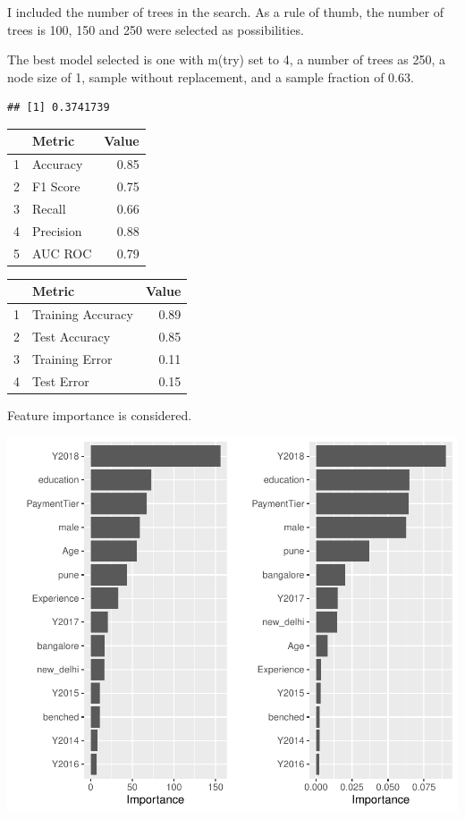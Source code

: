 \documentclass[11pt,preprint, authoryear]{elsarticle}
\let\origtable\table
\let\endorigtable\endtable
\renewenvironment{table}[1][2] {
    \expandafter\origtable\expandafter[H]
} {
    \endorigtable
}
\numberwithin{equation}{section}
\numberwithin{figure}{section}
\numberwithin{table}{section}
\begin{document}
I included the number of trees in the search. As a rule of thumb, the
number of trees is 100, 150 and 250 were selected as possibilities.

The best model selected is one with m(try) set to 4, a number of trees
as 250, a node size of 1, sample without replacement, and a sample
fraction of 0.63.

\begin{verbatim}
## [1] 0.3741739
\end{verbatim}

\begin{table}[H]
\centering
\begin{tabular}{rlr}
  \hline
 & Metric & Value \\ 
  \hline
1 & Accuracy & 0.85 \\ 
  2 & F1 Score & 0.75 \\ 
  3 & Recall & 0.66 \\ 
  4 & Precision & 0.88 \\ 
  5 & AUC ROC & 0.79 \\ 
   \hline
\end{tabular}
\caption{Metrics for Tuned Random Forest \label{tab1}} 
\end{table}

\begin{table}[H]
\centering
\begin{tabular}{rlr}
  \hline
 & Metric & Value \\ 
  \hline
1 & Training Accuracy & 0.89 \\ 
  2 & Test Accuracy & 0.85 \\ 
  3 & Training Error & 0.11 \\ 
  4 & Test Error & 0.15 \\ 
   \hline
\end{tabular}
\caption{More Metrics for Tuned Random Forest \label{tab1}} 
\end{table}

Feature importance is considered.

\includegraphics{Final_project_files/figure-latex/unnamed-chunk-18-1.pdf}
\end{document}
